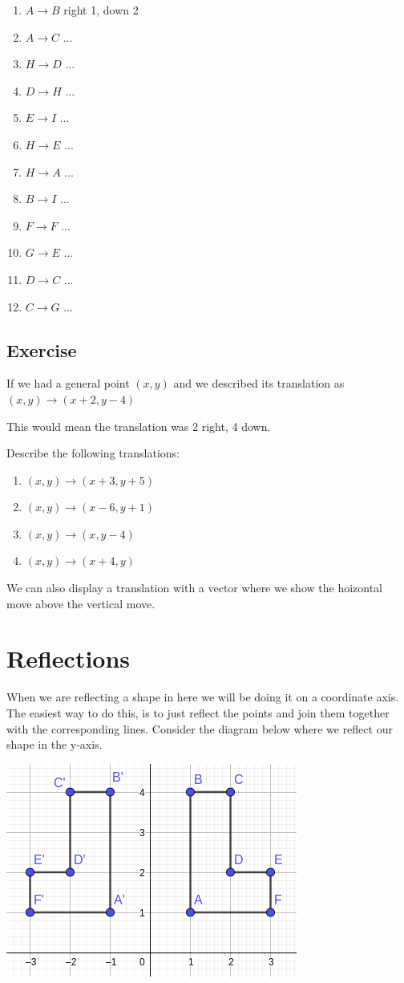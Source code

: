 	\begin{enumerate}
		\item $A \rightarrow B$ right 1, down 2
		\item $A \rightarrow C$ ...
		\item $H \rightarrow D$ ...
		\item $D \rightarrow H$ ...
		\item $E \rightarrow I$ ...
		\item $H \rightarrow E$ ...
		\item $H \rightarrow A$ ...
		\item $B \rightarrow I$ ...
		\item $F \rightarrow F$ ...
		\item $G \rightarrow E$ ...
		\item $D \rightarrow C$ ...
		\item $C \rightarrow G$ ...
	\end{enumerate}

\subsection{Exercise}
	If we had a general point $(x,y)$ and we described its translation as $(x,y) \rightarrow (x+2,y-4)$

	This would mean the translation was 2 right, 4 down.

	Describe the following translations:
	\begin{enumerate}
		\item $(x,y) \rightarrow (x+3,y+5)$
		\item $(x,y) \rightarrow (x-6,y+1)$
		\item $(x,y) \rightarrow (x,y-4)$
		\item $(x,y) \rightarrow (x+4,y)$
	\end{enumerate}

	We can also display a translation with a vector where we show the hoizontal move above the vertical move.
\section{Reflections}
When we are reflecting a shape in here we will be doing it on a coordinate axis.  The easiest way to do this, is to just reflect the points and join them together with the corresponding lines.  Consider the diagram below where we reflect our shape in the y-axis.

\bigskip

	\includegraphics[scale=0.6]{./Images/Transformations/Reflections_ex_1.png}

